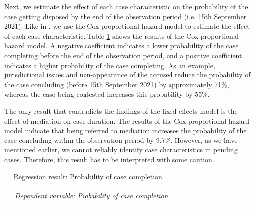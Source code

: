 \documentclass[12pt,a4paper]{article}
\begin{document}
\begin{appendices}
 Next, we estimate the effect of each case characteristic on the probability of the case getting disposed by the end of the observation period (i.e. 15th September 2021). Like in \textcite{datta2017_itatDelays}, we use the Cox-proportional hazard model to estimate the effect of each case characteristic. Table \ref{tab:survialProb} shows the results of the Cox-proportional hazard model. A negative coefficient indicates a lower probability of the case completing before the end of the observation period, and a positive coefficient indicates a higher probability of the case completing. As an example, jurisdictional issues and non-appearance of the accused reduce the probability of the case concluding (before 15th September 2021) by approximately 71\%, whereas the case being contested increases this probability by 55\%.
 
 The only result that contradicts the findings of the fixed-effects model is the effect of mediation on case duration. The results of the Cox-proportional hazard model indicate that being referred to mediation increases the probability of the case concluding within the observation period by 9.7\%. However, as we have mentioned earlier, we cannot reliably identify case characteristics in pending cases. Therefore, this result has to be interpreted with some caution.
 
 \newpage
 {\footnotesize
 \begin{longtable}[h]{lr}
 \caption{Regression result: Probability of case completion}\label{tab:survialProb}\\
 \\[-1.8ex] 
 \hline \\[-1.8ex] 
 & \multicolumn{1}{c}{\textit{Dependent variable: Probability of case completion}} \\ 
 \cline{2-2} 
 \hline \\[-1.8ex] 
 

\end{longtable}}
\end{appendices}
\end{document}
